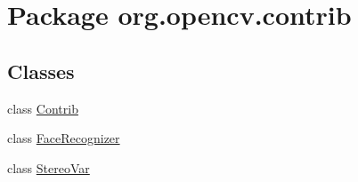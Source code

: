 \hypertarget{namespaceorg_1_1opencv_1_1contrib}{}\section{Package org.\+opencv.\+contrib}
\label{namespaceorg_1_1opencv_1_1contrib}
\subsection*{Classes}
\begin{DoxyCompactItemize}
\item 
class \mbox{\hyperlink{classorg_1_1opencv_1_1contrib_1_1_contrib}{Contrib}}
\item 
class \mbox{\hyperlink{classorg_1_1opencv_1_1contrib_1_1_face_recognizer}{Face\+Recognizer}}
\item 
class \mbox{\hyperlink{classorg_1_1opencv_1_1contrib_1_1_stereo_var}{Stereo\+Var}}
\end{DoxyCompactItemize}
